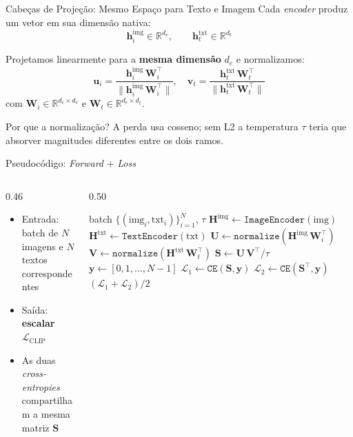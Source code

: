 \documentclass[aspectratio=169,xcolor=dvipsnames]{beamer}
\begin{document}
  \begin{frame}{Cabeças de Projeção: Mesmo Espaço para Texto e Imagem}
    Cada \textit{encoder} produz um vetor em sua dimensão nativa:
    \[
      \mathbf{h}_i^{\text{img}} \in \mathbb{R}^{d_v},\qquad
      \mathbf{h}_t^{\text{txt}} \in \mathbb{R}^{d_t}
    \]

    Projetamos linearmente para a \textbf{mesma dimensão} $d_e$ e normalizamos:
    \[
      \mathbf{u}_i = \frac{\mathbf{h}_i^{\text{img}}\, \mathbf{W}_i^{\top}}{\|\mathbf{h}_i^{\text{img}}\, \mathbf{W}_i^{\top}\|},\quad
      \mathbf{v}_t = \frac{\mathbf{h}_t^{\text{txt}}\, \mathbf{W}_t^{\top}}{\|\mathbf{h}_t^{\text{txt}}\, \mathbf{W}_t^{\top}\|}
    \]
    com $\mathbf{W}_i \in \mathbb{R}^{d_e \times d_v}$ e $\mathbf{W}_t \in \mathbb{R}^{d_e \times d_t}$.

    \vspace{0.4em}
    \begin{block}{Por que a normalização?}
      A perda usa cosseno; sem L2 a temperatura $\tau$ teria que absorver
      magnitudes diferentes entre os dois ramos.
    \end{block}
  \end{frame}

  \begin{frame}{Pseudocódigo: \textit{Forward} + \textit{Loss}}
    \begin{columns}[T]
      \begin{column}{0.46\textwidth}
        \begin{itemize}
          \item Entrada: batch de $N$ imagens e $N$ textos correspondentes
          \item Saída: \textbf{escalar} $\mathcal{L}_{\text{CLIP}}$
          \item As duas \textit{cross-entropies} compartilham a mesma matriz $\mathbf{S}$
        \end{itemize}
      \end{column}
      \begin{column}{0.50\textwidth}
        \begin{algorithmic}[1]
          \Require batch $\{(\mathrm{img}_i, \mathrm{txt}_i)\}_{i=1}^{N}$, $\tau$
          \State $\mathbf{H}^{\text{img}} \gets \texttt{ImageEncoder}(\mathrm{img})$
          \State $\mathbf{H}^{\text{txt}} \gets \texttt{TextEncoder}(\mathrm{txt})$
          \State $\mathbf{U} \gets \texttt{normalize}(\mathbf{H}^{\text{img}}\, \mathbf{W}_i^{\top})$
          \State $\mathbf{V} \gets \texttt{normalize}(\mathbf{H}^{\text{txt}}\, \mathbf{W}_t^{\top})$
          \State $\mathbf{S} \gets \mathbf{U}\, \mathbf{V}^{\top} / \tau$
          \State $\mathbf{y} \gets [0, 1, \ldots, N{-}1]$
          \State $\mathcal{L}_1 \gets \texttt{CE}(\mathbf{S}, \mathbf{y})$
          \State $\mathcal{L}_2 \gets \texttt{CE}(\mathbf{S}^{\top}, \mathbf{y})$
          \State \Return $(\mathcal{L}_1 + \mathcal{L}_2)/2$
        \end{algorithmic}
      \end{column}
    \end{columns}
  \end{frame}
\end{document}
